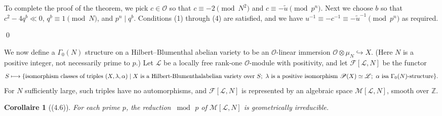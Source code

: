 \documentclass[12pt,a4paper]{article}
\theoremstyle{plain}
\newtheorem{corollary}[theorem]{Corollaire}
\theoremstyle{definition}
\theoremstyle{remark}
\begin{document}
To complete the proof of the theorem, we pick $c \in \mathcal{O}$ so that $c \equiv -2 \pmod{N^2}$ and $c \equiv -\tilde{u} \pmod{p^n}$. Next we choose $b$ so that $c^2 - 4q^b \ll 0$, $q^b \equiv 1 \pmod{N}$, and $p^n \mid q^b$. Conditions (1) through (4) are satisfied, and we have $u^{-1} \equiv -c^{-1} \equiv -\tilde{u}^{-1} \pmod{p^n}$ as required.

\qed

We now define a $\Gamma_0(N)$ structure on a Hilbert--Blumenthal abelian variety to be an $\mathcal{O}$-linear immersion $\mathcal{O} \otimes \mu_N \hookrightarrow X$. (Here $N$ is a positive integer, not necessarily prime to $p$.) Let $\mathscr{L}$ be a locally free rank-one $\mathcal{O}$-module with positivity, and let $\mathscr{F}[\mathscr{L}, N]$ be the functor
\[
S \longmapsto \{\text{isomorphism classes of triples } (X, \lambda, \alpha) \mid X \text{ is a Hilbert-Blumenthal} \\
\text{abelian variety over } S;\ \lambda \text{ is a positive isomorphism } \mathscr{P}(X) \simeq \mathscr{L};\ \alpha \text{ is} \\
\text{a } \Gamma_0(N)\text{-structure}\}.
\]
For $N$ sufficiently large, such triples have no automorphisms, and $\mathscr{F}[\mathscr{L}, N]$ is represented by an algebraic space $\mathscr{M}[\mathscr{L}, N]$, smooth over $\mathbb{Z}$.

\begin{corollary}[(4.6)]
For each prime $p$, the reduction $\bmod\, p$ of $\mathscr{M}[\mathscr{L}, N]$ is geometrically irreducible.
\end{corollary}
\end{document}
